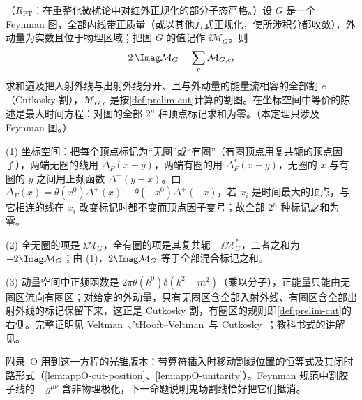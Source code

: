 \begin{theorem}\label{thm:prelim-cutting-rules}
（$R_{\mathrm{PT}}$：在重整化微扰论中对红外正规化的部分子态严格。）设 $G$ 是一个 Feynman 图，全部内线带正质量（或以其他方式正规化，使所涉积分都收敛），外动量为实数且位于物理区域；把图 $G$ 的值记作 $\ii\mathcal M_G$。则
\begin{equation}\label{eq:prelim-cutting}
2\,\Imag\mathcal M_G=\sum_{c}\mathcal M_{G,c},
\end{equation}
求和遍及把入射外线与出射外线分开、且与外动量的能量流相容的全部割 $c$（Cutkosky 割），$\mathcal M_{G,c}$ 是按\cref{def:prelim-cut}计算的割图。在坐标空间中等价的陈述是最大时间方程：对图的全部 $2^n$ 种顶点标记求和为零。（本定理只涉及 Feynman 图。）
\end{theorem}

\begin{proofsketch}
(1) 坐标空间：把每个顶点标记为“无圈”或“有圈”（有圈顶点用复共轭的顶点因子），两端无圈的线用 $\Delta_F(x-y)$，两端有圈的用 $\Delta_F^*(x-y)$，无圈的 $x$ 与有圈的 $y$ 之间用正频函数 $\Delta^+(y-x)$。由 $\Delta_F(x)=\theta(x^0)\Delta^+(x)+\theta(-x^0)\Delta^+(-x)$，若 $x_i$ 是时间最大的顶点，与它相连的线在 $x_i$ 改变标记时都不变而顶点因子变号；故全部 $2^n$ 种标记之和为零。

(2) 全无圈的项是 $\ii\mathcal M_G$，全有圈的项是其复共轭 $-\ii\mathcal M_G^*$，二者之和为 $-2\Imag\mathcal M_G$；由 (1)，$2\Imag\mathcal M_G$ 等于全部混合标记之和。

(3) 动量空间中正频函数是 $2\pi\theta(k^0)\delta(k^2-m^2)$（乘以分子），正能量只能由无圈区流向有圈区；对给定的外动量，只有无圈区含全部入射外线、有圈区含全部出射外线的标记保留下来，这正是 Cutkosky 割，有圈区的规则即\cref{def:prelim-cut}的右侧。完整证明见 Veltman~\cite{Veltman1963}、'tHooft--Veltman~\cite{tHooftVeltman1974}与 Cutkosky~\cite{Cutkosky1960}；教科书式的讲解见\cite[第~7.3~节]{PeskinSchroeder1995}。
\end{proofsketch}

附录~O 用到这一方程的光锥版本：带算符插入时移动割线位置的恒等式及其闭时路形式（\cref{lem:appO-cut-position}、\cref{lem:appO-unitarity}）。Feynman 规范中割胶子线的 $-g^{\mu\nu}$ 含非物理极化，下一命题说明鬼场割线恰好把它们抵消。

